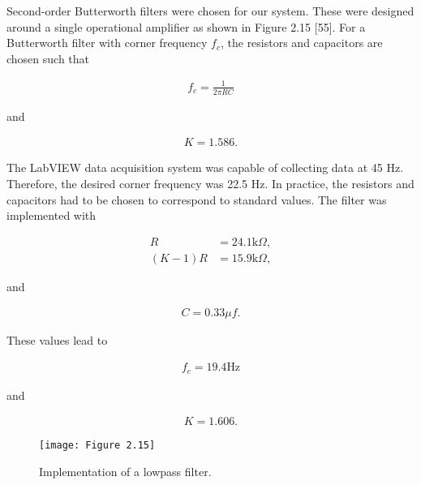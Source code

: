 Second-order Butterworth filters were chosen for our system. These were designed around a single operational amplifier as shown in Figure 2.15 [55]. For a Butterworth filter with corner frequency $f_{c}$, the resistors and capacitors are chosen such that


\begin{align}
	f_{c} = \frac{1}{2\pi RC}
\end{align}

\noindent and

\begin{align}
	K=1.586.
\end{align}


\noindent The LabVIEW data acquisition system was capable of collecting data at 45 Hz. Therefore, the desired corner frequency was 22.5 Hz. In practice, the resistors and capacitors had to be chosen to correspond to standard values. The filter was implemented with



\begin{align}
	R&=24.1 \text{k}\Omega,\\
	(K-1)R&= 15.9 \text{k}\Omega,
\end{align}

\noindent and

\begin{align}
	C=0.33\mu f.
\end{align}

\noindent These values lead to

\begin{align}
	f_{c}=19.4 \text{Hz}
\end{align}

\noindent and

\begin{align}
	K=1.606.
\end{align}

\begin{figure}[H]
	\centering
	\texttt{[image: Figure 2.15]}
	\bf\caption{  Implementation of a lowpass filter.}
	\label{fig:2.15}
\end{figure}


